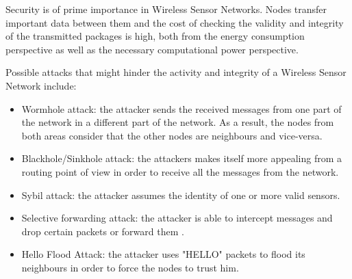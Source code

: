 Security is of prime importance in Wireless Sensor Networks. Nodes transfer important data between
them and the cost of checking the validity and integrity of the transmitted packages is high, both from 
the energy consumption perspective as well as the necessary computational power perspective.

Possible attacks that might hinder the activity and integrity of a Wireless Sensor Network include:
\begin{itemize}

\item Wormhole attack: the attacker sends the received messages from one part of the network in a different part of the network. As a result, the nodes from both areas consider that the other nodes are neighbours and vice-versa.
\item Blackhole/Sinkhole attack: the attackers makes itself more appealing from a routing point of view in order to receive all the messages from the network.
\item Sybil attack: the attacker assumes the identity of one or more valid sensors\cite{newsome2004sybil}.
\item Selective forwarding attack: the attacker is able to intercept messages and drop certain packets or forward them \cite{kaplantzis2007detecting}.
\item Hello Flood Attack: the attacker uses "HELLO" packets to flood its neighbours in order to force the nodes to trust him.

\end{itemize}

